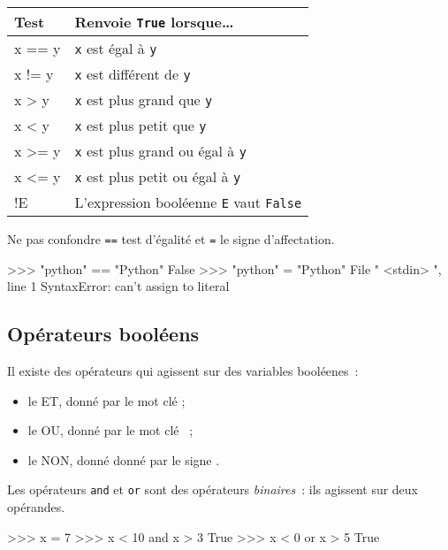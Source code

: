 \begin{center}
\tabulinesep=1.5mm
\begin{tabu}to0.9
\hline
\textbf{\rmfamily Test} & Renvoie \texttt{True} lorsque\dots\\
\hline
x == y & \texttt{x} est égal à \texttt{y}\\
x != y & \texttt{x} est différent de \texttt{y}\\
x > y & \texttt{x} est plus grand que \texttt{y}\\
x < y & \texttt{x} est plus petit que \texttt{y}\\
x >= y & \texttt{x} est plus grand ou égal à \texttt{y}\\
x <= y & \texttt{x} est plus petit ou égal à \texttt{y}\\
\hline
!E & L'expression booléenne \texttt{E} vaut \texttt{False}\\
\hline
\end{tabu}
\end{center}

\begin{remarque}
Ne pas confondre \texttt{==} test d'égalité et \texttt{=} le signe d'affectation.
\end{remarque}

\begin{pythoncode}
>>> "python" == "Python"
False
>>> "python" = "Python"
File " <stdin> ", line 1
SyntaxError: can't assign to literal
\end{pythoncode}

\subsection{Opérateurs booléens}

Il existe des opérateurs qui agissent sur des variables booléenes~:
\begin{itemize}
	\item le ET, donné par le mot clé ;
	\item le OU, donné par le mot clé ~;
	\item le NON, donné donné par le signe .
\end{itemize}

Les opérateurs \texttt{and} et \texttt{or} sont des opérateurs \textit{binaires}~: ils agissent sur
deux opérandes.
\begin{pythoncode}
>>> x = 7
>>> x < 10 and x > 3
True
>>> x < 0 or x > 5
True
\end{pythoncode}

